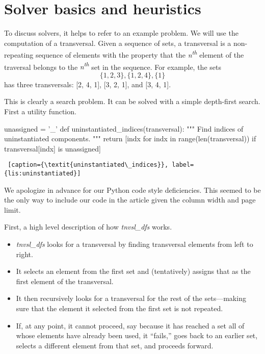 \section{Solver basics and heuristics} \label{sec:solver-basics}

To discuss solvers, it helps to refer to an example problem. We will use the computation of a transversal. Given a sequence of sets, a transversal is a non-repeating sequence of elements with the property that the \textit{n\textsuperscript{th}} element of the traversal belongs to the \textit{n\textsuperscript{th}} set in the sequence.  For example, the sets \[\{1, 2, 3\}, \{1, 2, 4\}, \{1\}\] has three transversals: [2, 4, 1], [3, 2, 1], and [3, 4, 1]. 

This is clearly a search problem. It can be solved with a simple depth-first search. First a utility function.

\begin{minipage}[c]{0.45\textwidth}
\begin{python1}[numbers=left]
unassigned = '_'
def uninstantiated_indices(transversal):
  """ Find indices of uninstantiated components. """
  return [indx for indx in range(len(transversal)) 
               if transversal[indx] is unassigned]
\end{python1}
\begin{lstlisting} [caption={\textit{uninstantiated\_indices}}, label={lis:uninstantiated}]
\end{lstlisting}
\end{minipage}

We apologize in advance for our Python code style deficiencies. This seemed to be the only way to include our code in the article given the column width and page limit.

First, a high level description of how \textit{tnvsl\_dfs} works. 
\begin{itemize}
    \item \textit{tnvsl\_dfs} looks for a transversal by finding transversal elements from left to right.
    \item It selects an element from the first set and (tentatively) assigns that as the first element of the transversal.
    \item It then recursively looks for a transversal for the rest of the sets---making sure that the element it selected from the first set is not repeated.
    \item If, at any point, it cannot proceed, say because it has reached a set all of whose elements have already been used, it ``fails,'' goes back to an earlier set, selects a different element from that set, and proceeds forward.
\end{itemize}

